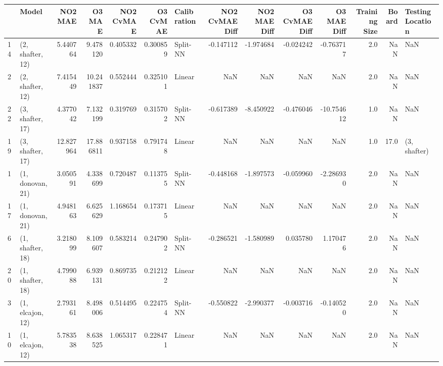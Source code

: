 \begin{tabular}{llrrrrlrrrrrrl}
\toprule
{} &             Model &    NO2 MAE &     O3 MAE &  NO2 CvMAE &  O3 CvMAE & Calibration &  NO2 CvMAE Diff &  NO2 MAE Diff &  O3 CvMAE Diff &  O3 MAE Diff &  Training Size &  Board & Testing Location \\
\midrule
14 &  (2, shafter, 12) &   5.440764 &   9.478120 &   0.405332 &  0.300859 &    Split-NN &       -0.147112 &     -1.974684 &      -0.024242 &    -0.763717 &            2.0 &    NaN &              NaN \\
2  &  (2, shafter, 12) &   7.415449 &  10.241837 &   0.552444 &  0.325101 &      Linear &             NaN &           NaN &            NaN &          NaN &            2.0 &    NaN &              NaN \\
22 &  (3, shafter, 17) &   4.377042 &   7.132199 &   0.319769 &  0.315702 &    Split-NN &       -0.617389 &     -8.450922 &      -0.476046 &   -10.754612 &            1.0 &    NaN &              NaN \\
19 &  (3, shafter, 17) &  12.827964 &  17.886811 &   0.937158 &  0.791748 &      Linear &             NaN &           NaN &            NaN &          NaN &            1.0 &   17.0 &     (3, shafter) \\
1  &  (1, donovan, 21) &   3.050591 &   4.338699 &   0.720487 &  0.113755 &    Split-NN &       -0.448168 &     -1.897573 &      -0.059960 &    -2.286930 &            2.0 &    NaN &              NaN \\
17 &  (1, donovan, 21) &   4.948163 &   6.625629 &   1.168654 &  0.173715 &      Linear &             NaN &           NaN &            NaN &          NaN &            2.0 &    NaN &              NaN \\
6  &  (1, shafter, 18) &   3.218099 &   8.109607 &   0.583214 &  0.247902 &    Split-NN &       -0.286521 &     -1.580989 &       0.035780 &     1.170476 &            2.0 &    NaN &              NaN \\
20 &  (1, shafter, 18) &   4.799088 &   6.939131 &   0.869735 &  0.212122 &      Linear &             NaN &           NaN &            NaN &          NaN &            2.0 &    NaN &              NaN \\
3  &  (1, elcajon, 12) &   2.793161 &   8.498006 &   0.514495 &  0.224754 &    Split-NN &       -0.550822 &     -2.990377 &      -0.003716 &    -0.140520 &            2.0 &    NaN &              NaN \\
10 &  (1, elcajon, 12) &   5.783538 &   8.638525 &   1.065317 &  0.228471 &      Linear &             NaN &           NaN &            NaN &          NaN &            2.0 &    NaN &              NaN \\

\end{tabular}
